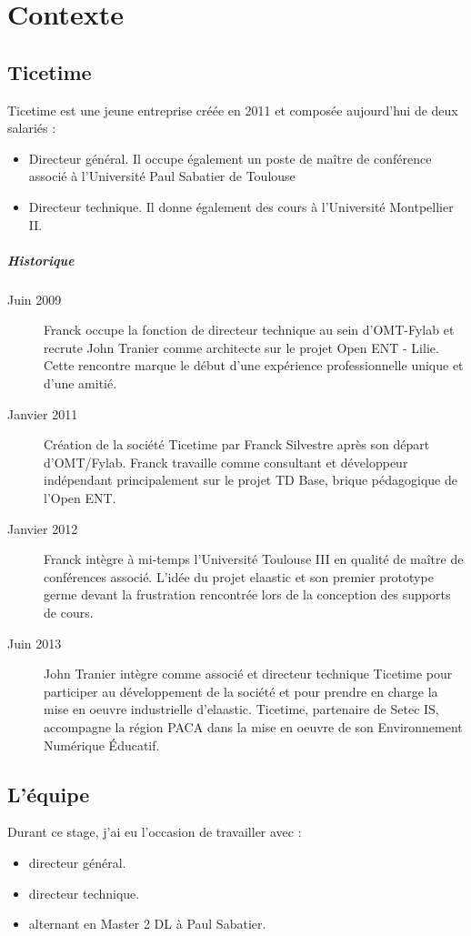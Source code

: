\chapter{Contexte}
\section{Ticetime}
\newcommand{\ticetime}[2]{\item[{\it #1}] #2}
Ticetime est une jeune entreprise créée en 2011 et composée aujourd'hui de deux salariés :
\begin{itemize}
  \ticetime{Franck Silvestre}{Directeur général. Il occupe également
  un poste de maître de conférence associé à l'Université Paul Sabatier de
  Toulouse}
  \ticetime{John Tranier}{Directeur technique. Il donne également des cours à
  l'Université Montpellier II.}
\end{itemize}

\paragraph{Historique}
\begin{description}
  \item[Juin 2009] Franck occupe la fonction de directeur technique au sein
	d'OMT-Fylab et recrute John Tranier comme architecte sur le projet Open ENT
	- Lilie. Cette rencontre marque le début d'une expérience professionnelle
	unique et d'une amitié.
  \item[Janvier 2011] Création de la société Ticetime par Franck Silvestre après
	son départ d'OMT/Fylab. Franck travaille comme consultant et développeur
	indépendant principalement sur le projet TD Base, brique pédagogique de
	l'Open ENT.
  \item[Janvier 2012] Franck intègre à mi-temps l'Université Toulouse III en
	qualité de maître de conférences associé. L'idée du projet elaastic et son
	premier prototype germe devant la frustration rencontrée lors de la
	conception des supports de cours.
  \item[Juin 2013] John Tranier intègre comme associé et directeur technique
	Ticetime pour participer au développement de la société et pour prendre en
	charge la mise en oeuvre industrielle d'elaastic. Ticetime, partenaire de
	Setec IS, accompagne la région PACA dans la mise en oeuvre de son
	Environnement Numérique Éducatif.
\end{description}
\section{L'équipe}
Durant ce stage, j'ai eu l'occasion de travailler avec :\\
\begin{itemize}
  \ticetime{Franck Silvestre}{directeur général.}
  \ticetime{John Tranier}{directeur technique.}
  \ticetime{Vincent Tertre}{alternant en Master 2 DL à Paul Sabatier.}
\end{itemize}
